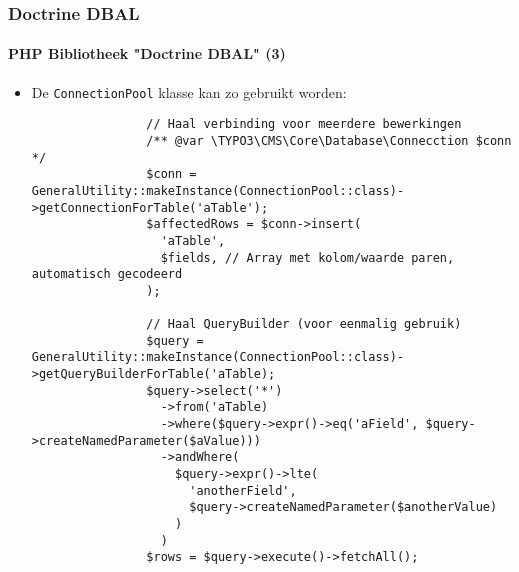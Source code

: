 \begin{frame}[fragile]
	\frametitle{Doctrine DBAL}
	\framesubtitle{PHP Bibliotheek "Doctrine DBAL" (3)}

	\lstset{basicstyle=\tiny\ttfamily}

	\begin{itemize}

		\item De \texttt{ConnectionPool} klasse kan zo gebruikt worden:
			\begin{lstlisting}
				// Haal verbinding voor meerdere bewerkingen
				/** @var \TYPO3\CMS\Core\Database\Connecction $conn */
				$conn = GeneralUtility::makeInstance(ConnectionPool::class)->getConnectionForTable('aTable');
				$affectedRows = $conn->insert(
				  'aTable',
				  $fields, // Array met kolom/waarde paren, automatisch gecodeerd
				);

				// Haal QueryBuilder (voor eenmalig gebruik)
				$query = GeneralUtility::makeInstance(ConnectionPool::class)->getQueryBuilderForTable('aTable);
				$query->select('*')
				  ->from('aTable)
				  ->where($query->expr()->eq('aField', $query->createNamedParameter($aValue)))
				  ->andWhere(
					$query->expr()->lte(
					  'anotherField',
					  $query->createNamedParameter($anotherValue)
					)
				  )
				$rows = $query->execute()->fetchAll();
			\end{lstlisting}
	\end{itemize}

\end{frame}


